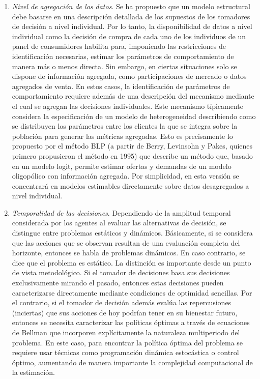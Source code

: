\documentclass[
]{book}
\begin{document}
\begin{enumerate}
\def\labelenumi{\arabic{enumi}.}
\item
  \emph{Nivel de agregación de los datos}. Se ha propuesto que un modelo estructural debe basarse en una descripción detallada de los supuestos de los tomadores de decisión a nivel individual. Por lo tanto, la disponibilidad de datos a nivel individual como la decisión de compra de cada uno de los individuos de un panel de consumidores habilita para, imponiendo las restricciones de identificación necesarias, estimar los parámetros de comportamiento de manera más o menos directa. Sin embargo, en ciertas situaciones solo se dispone de información agregada, como participaciones de mercado o datos agregados de venta. En estos casos, la identificación de parámetros de comportamiento requiere además de una descripción del mecanismo mediante el cual se agregan las decisiones individuales. Este mecanismo típicamente considera la especificación de un modelo de heterogeneidad describiendo como se distribuyen los parámetros entre los clientes la que se integra sobre la población para generar las métricas agregadas. Esto es precisamente lo propuesto por el método BLP (a partir de
  Berry, Levinsohn y Pakes, quienes primero propusieron el método en 1995) que describe un método que, basado en un modelo logit, permite estimar ofertas y demandas de un modelo oligopólico con información agregada. Por simplicidad, en esta versión se concentrará en modelos estimables directamente sobre datos desagregados a nivel individual.
\item
  \emph{Temporalidad de las decisiones}. Dependiendo de la amplitud temporal considerada por los agentes al evaluar las alternativas de decisión, se distingue entre problemas estáticos y dinámicos. Básicamente, si se considera que las acciones que se observan resultan de una evaluación completa del horizonte, entonces se habla de problemas dinámicos. En caso contrario, se dice que el problema es estático. La distinción es importante desde un punto de vista metodológico. Si el tomador de decisiones basa sus decisiones exclusivamente
  mirando el pasado, entonces estas decisiones pueden caracterizarse directamente mediante condiciones de optimidad sencillas. Por el contrario, si el tomador de decisión además evalúa las repercusiones (inciertas) que sus acciones de hoy podrían tener en su bienestar futuro, entonces se necesita caracterizar las políticas óptimas a través de ecuaciones de Bellman que incorporen explícitamente la naturaleza multiperiodo del problema. En este caso, para encontrar la política óptima del problema se requiere usar técnicas como programación dinámica estocástica o control óptimo, aumentando de manera importante la complejidad computacional de la estimación.

\end{enumerate}
\end{document}
